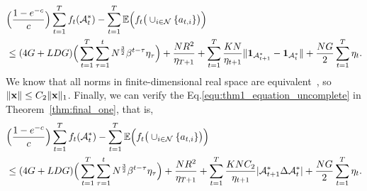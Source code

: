 	\begin{equation*}
	\begin{aligned}
		&\Big(\frac{1-e^{-c}}{c}\Big)\sum_{t=1}^{T}f_{t}(\mathcal{A}^{*}_{t})-\sum_{t=1}^{T}\mathbb{E}\Big(f_{t}\big(\cup_{i\in\mathcal{N}}\{a_{t,i}\}\big)\Big)\\
		&\le(4G+LDG)\Big(\sum_{t=1}^{T}\sum_{\tau=1}^{t}N^{\frac{3}{2}}\beta^{t-\tau}\eta_{\tau}\Big)+\frac{NR^{2}}{\eta_{T+1}}+\sum_{t=1}^{T}\frac{KN} {\eta_{t+1}}\|\mathbf{1}_{\mathcal{A}_{t+1}^{*}}-\mathbf{1}_{\mathcal{A}_{t}^{*}}\|+\frac{NG}{2}\sum_{t=1}^{T}\eta_{t}.		
	\end{aligned}
\end{equation*}
We know that all norms in finite-dimensional real space are equivalent~\citep{lax2014functional,zhao2024minimax}, so $\|\mathbf{x}\|\le C_{2}\|\mathbf{x}\|_{1}$.
Finally,  we can verify the Eq.\eqref{equ:thm1_equation_uncomplete} in Theorem~\ref{thm:final_one}, that is,
	\begin{equation*}
	\begin{aligned}
		&\Big(\frac{1-e^{-c}}{c}\Big)\sum_{t=1}^{T}f_{t}(\mathcal{A}^{*}_{t})-\sum_{t=1}^{T}\mathbb{E}\Big(f_{t}\big(\cup_{i\in\mathcal{N}}\{a_{t,i}\}\big)\Big)\\
		&\le(4G+LDG)\Big(\sum_{t=1}^{T}\sum_{\tau=1}^{t}N^{\frac{3}{2}}\beta^{t-\tau}\eta_{\tau}\Big)+\frac{NR^{2}}{\eta_{T+1}}+\sum_{t=1}^{T}\frac{KNC_{2}} {\eta_{t+1}}|\mathcal{A}_{t+1}^{*}\Delta\mathcal{A}_{t}^{*}|+\frac{NG}{2}\sum_{t=1}^{T}\eta_{t}.		
	\end{aligned}
\end{equation*}
